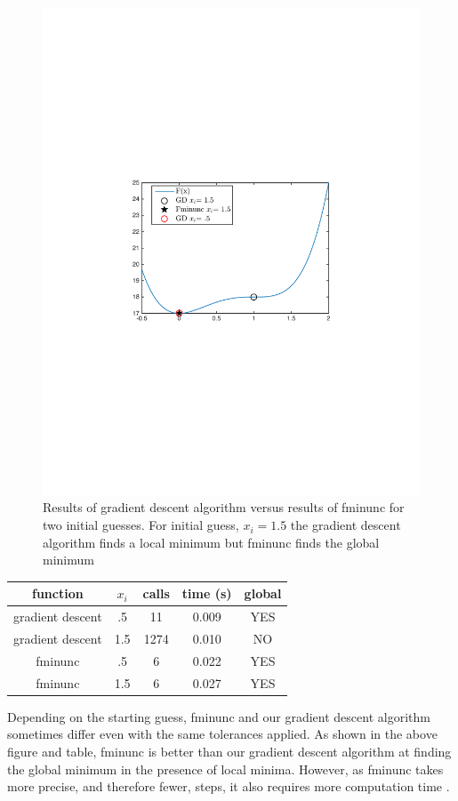 \documentclass[10pt,twocolumn]{article}
\begin{document}
\begin{figure}[H]
\label{fig: fminunc}
\center
\includegraphics[scale =.5]{comparetofminunc.pdf}
\caption{Results of gradient descent algorithm versus results of fminunc for two initial guesses. For initial guess, $x_i= 1.5$ the gradient descent algorithm finds a local minimum but fminunc finds the global minimum}
\end{figure}
 

\begin{center}
  \begin{tabular}{ | c | c | c | c | c | }
    \hline
     function & $x_i$ & calls &  time (s) & global \\ \hline
     gradient descent & .5 &  11 &  0.009 & YES \\ \hline
     gradient descent & 1.5 & 1274  & 0.010 & NO \\ \hline
    fminunc & .5  & 6 & 0.022 & YES  \\ \hline
      fminunc &1.5 & 6 & 0.027 & YES \\ 
    \hline
  \end{tabular}
\end{center}
Depending on the starting guess, fminunc and our gradient descent algorithm sometimes differ even with the same tolerances applied. As shown in the above figure and table, fminunc is better than our gradient descent algorithm at finding the global minimum in the presence of local minima.  However, as fminunc takes more precise, and therefore fewer, steps,  it also requires more computation time .
\end{document}
